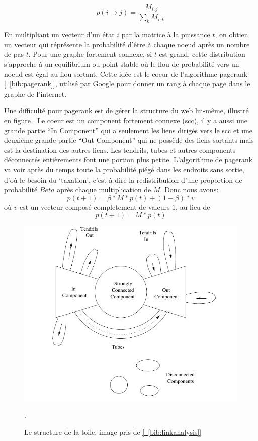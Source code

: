$$p(i\rightarrow j) = \frac{M_{i,j}}{\sum\limits_{k} M_{i,k}}$$

En multipliant un vecteur d'un état $i$ par la matrice à la puissance $t$, on obtien un vecteur
qui réprésente la probabilité d'être à chaque noeud après un nombre de pas $t$. Pour une graphe
fortement connexe, si $t$ est grand,
cette distribution s'approche à un equilibrium ou point stable où le flou de probabilité vers
un noeud est égal au flou sortant. Cette idée est le coeur de l'algorithme pagerank
\hyperref[bib:pagerank]{[~\ref*{bib:pagerank}]},
utilisé par Google pour donner un rang à chaque page dans le graphe de l'internet.

Une difficulté pour pagerank est de gérer la structure du web lui-même, illustré en
figure \hyperref[fig:webstructure]. Le coeur est un component fortement connexe (scc), il y a
aussi une grande partie ``In Component'' qui a seulement les liens dirigés vers le scc
et une deuxième grande partie ``Out Component'' qui ne possède des liens sortants mais
est la destination des autres liens. Les tendrils, tubes et autres components déconnectés
entièrements font une portion plus petite. L'algorithme de pagerank va voir après du temps
toute la probabilité piégé dans les endroits sans sortie, d'où le besoin du `taxation',
c'est-à-dire la redistribution d'une proportion de probabilité $Beta$ après chaque
multiplication de $M$. Donc nous avons:
$$ p(t+1) = \beta*M*p(t) + (1-\beta)*v$$
où $v$ est un vecteur composé completement de valeurs $1$, au lieu de
$$ p(t+1) = M*p(t)$$ 

\begin{figure}[!ht]
\centering
\includegraphics{Images/web_graph_structure.png}
\caption{Le structure de la toile, image pris de
\hyperref[bib:linkanalysis]{[~\ref*{bib:linkanalysis}]}}.
\label{fig:square}
\end{figure}


